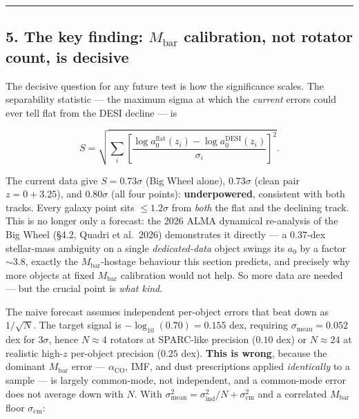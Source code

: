 \documentclass[
]{article}
\begin{document}
\begin{center}\rule{0.5\linewidth}{0.5pt}\end{center}

\subsection{\texorpdfstring{5. The key finding: \(M_\mathrm{bar}\)
calibration, not rotator count, is
decisive}{5. The key finding: M\_\{\textbackslash rm bar\} calibration, not rotator count, is decisive}}\label{the-key-finding-m_rm-bar-calibration-not-rotator-count-is-decisive}

The decisive question for any future test is how the significance
scales. The separability statistic --- the maximum sigma at which the
\emph{current} errors could ever tell flat from the DESI decline --- is

\[S=\sqrt{\sum_i\left[\frac{\log a_0^\mathrm{flat}(z_i)-\log a_0^\mathrm{DESI}(z_i)}{\sigma_i}\right]^2}.\]

The current data give \(S=0.73\sigma\) (Big Wheel alone), \(0.73\sigma\)
(clean pair \(z=0+3.25\)), and \(0.80\sigma\) (all four points):
\textbf{underpowered}, consistent with both tracks. Every galaxy point
sits \(\le1.2\sigma\) from \emph{both} the flat and the declining track.
This is no longer only a forecast: the 2026 ALMA dynamical re-analysis
of the Big Wheel (§4.2, Quadri et al.~2026) demonstrates it directly ---
a \(0.37\)-dex stellar-mass ambiguity on a single \emph{dedicated-data}
object swings its \(a_0\) by a factor \(\sim3.8\), exactly the
\(M_\mathrm{bar}\)-hostage behaviour this section predicts, and precisely
why more objects at fixed \(M_\mathrm{bar}\) calibration would not help. So
more data are needed --- but the crucial point is \emph{what kind}.

The naive forecast assumes independent per-object errors that beat down
as \(1/\sqrt{N}\). The target signal is \(-\log_{10}(0.70)=0.155\) dex,
requiring \(\sigma_\mathrm{mean}=0.052\) dex for \(3\sigma\), hence
\(N\approx4\) rotators at SPARC-like precision (\(0.10\) dex) or
\(N\approx24\) at realistic high-\(z\) per-object precision (\(0.25\)
dex). \textbf{This is wrong}, because the dominant \(M_\mathrm{bar}\) error
--- \(\alpha_\mathrm{CO}\), IMF, and dust prescriptions applied
\emph{identically} to a sample --- is largely common-mode, not
independent, and a common-mode error does not average down with \(N\).
With \(\sigma_\mathrm{mean}^2=\sigma_\mathrm{ind}^2/N+\sigma_\mathrm{cm}^2\) and
a correlated \(M_\mathrm{bar}\) floor \(\sigma_\mathrm{cm}\):
\end{document}
